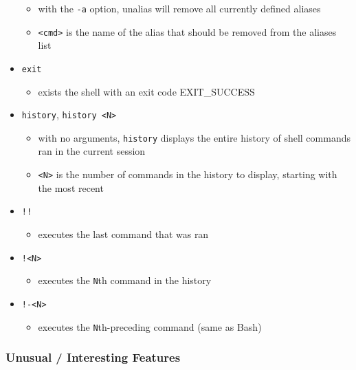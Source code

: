\documentclass[]{article}
\providecommand{\tightlist}{%
  \setlength{\itemsep}{0pt}\setlength{\parskip}{0pt}}
\begin{document}
\begin{itemize}
  \begin{itemize}
  \tightlist
  \item
    with the \texttt{-a} option, unalias will remove all currently
    defined aliases
  \item
    \texttt{\textless{}cmd\textgreater{}} is the name of the alias that
    should be removed from the aliases list
  \end{itemize}
\item
  \texttt{exit}

  \begin{itemize}
  \tightlist
  \item
    exists the shell with an exit code EXIT\_SUCCESS
  \end{itemize}
\item
  \texttt{history}, \texttt{history\ \textless{}N\textgreater{}}

  \begin{itemize}
  \tightlist
  \item
    with no arguments, \texttt{history} displays the entire history of
    shell commands ran in the current session
  \item
    \texttt{\textless{}N\textgreater{}} is the number of commands in the
    history to display, starting with the most recent
  \end{itemize}
\item
  \texttt{!!}

  \begin{itemize}
  \tightlist
  \item
    executes the last command that was ran
  \end{itemize}
\item
  \texttt{!\textless{}N\textgreater{}}

  \begin{itemize}
  \tightlist
  \item
    executes the \texttt{N}th command in the history
  \end{itemize}
\item
  \texttt{!-\textless{}N\textgreater{}}

  \begin{itemize}
  \tightlist
  \item
    executes the \texttt{N}th-preceding command (same as Bash)
  \end{itemize}
\end{itemize}

\subsubsection{Unusual / Interesting
Features}\label{unusual-interesting-features}
\end{document}
